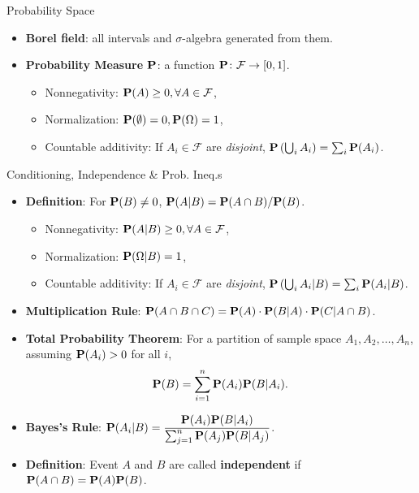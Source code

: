 \documentclass[landscape,a4paper]{article}
\begin{document}
\begin{cheatsheetcolumns}
\begin{card}{Probability Space}
\begin{itemize}
\begin{itemize}
					\item If $A_i\in\mathcal F$, then $\bigcup_i A_i\in\mathcal F$.
				\end{itemize}
				\item \textbf{Borel field}: all intervals and $\sigma$-algebra generated from them.
				\item \textbf{Probability Measure $\mathbf{P}$}: a function $\mathbf{P} \colon \mathcal F\to [0,1]$.
				\begin{itemize}
					\item Nonnegativity: $\mathbf{P}(A)\ge 0,\forall A\in\mathcal F$,
					\item Normalization: $\mathbf{P}(\emptyset)=0,\mathbf{P}(\Omega)=1$,
					\item Countable additivity: If $A_i\in\mathcal F$ are \textit{disjoint}, $\mathbf{P}\left(\bigcup_i A_i\right)=\sum_i\mathbf{P}(A_i)$.
				\end{itemize}
			\end{itemize}
		\end{card}
		\begin{card}{Conditioning, Independence \& Prob. Ineq.s}
			\begin{itemize}
				\item \textbf{Definition}: For $\mathbf{P}(B)\neq 0$, $\mathbf{P}(A|B)=\mathbf{P}(A\cap B)/\mathbf{P}(B)$.
				\begin{itemize}
					\item Nonnegativity: $\mathbf{P}(A|B)\ge 0,\forall A\in\mathcal F$,
					\item Normalization: $\mathbf{P}(\Omega|B)=1$,
					\item Countable additivity: If $A_i\in\mathcal F$ are \textit{disjoint}, $\mathbf{P}\left(\bigcup_i A_i|B\right)=\sum_i\mathbf{P}(A_i|B)$.
				\end{itemize}
				\item \textbf{Multiplication Rule}: $\mathbf{P}(A\cap B\cap C)=\mathbf{P}(A)\cdot\mathbf{P}(B|A)\cdot\mathbf{P}(C|A\cap B)$.
				\item \textbf{Total Probability Theorem}: For a partition of sample space $A_1, A_2,\dots, A_n$, assuming $\mathbf{P}(A_i)>0$ for all $i$,
				\[
				\mathbf{P}(B)=\sum_{i=1}^n \mathbf{P}(A_i)\mathbf{P}(B|A_i).
				\]
				\item \textbf{Bayes's Rule}: $\mathbf{P}(A_i|B)=\dfrac{\mathbf{P}(A_i)\mathbf{P}(B|A_i)}{\sum_{j=1}^n\mathbf{P}(A_j)\mathbf{P}(B|A_j)}$.
			\end{itemize}
			\begin{itemize}
			\item \textbf{Definition}: Event $A$ and $B$ are called \textbf{independent} if $\mathbf{P}(A\cap B)=\mathbf{P}(A)\mathbf{P}(B)$.

\end{itemize}
\end{card}
\end{cheatsheetcolumns}
\end{document}
